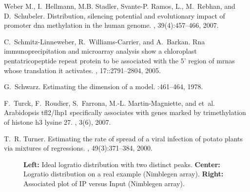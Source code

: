 \documentclass{bioinfo}
\begin{document}
\begin{thebibliography}{}
Weber M., I.~Hellmann, M.B. Stadler, Svante-P. Ramos, L., M.~Rebhan, and
  D.~Schubeler.
\newblock Distribution, silencing potential and evolutionary impact of promoter
  dna methylation in the human genome.
, 39(4):457--466, 2007.

C.~Schmitz-Linneweber, R.~Williams-Carrier, and A.~Barkan.
\newblock Rna immunoprecipitation and microarray analysis show a chloroplast
  pentatricopeptide repeat protein to be associated with the 5' region of mrnas
  whose translation it activates.
, 17::2791--2804, 2005.

G.~Schwarz.
\newblock Estimating the dimension of a model.
:461--464, 1978.

F.~Turck, F.~Roudier, S.~Farrona, M.-L. Martin-Magniette, and et~al.
\newblock Arabidopsis tfl2/lhp1 specifically associates with genes marked by
  trimethylation of histone h3 lysine 27.
, 3(6), 2007.

T.~R. Turner.
\newblock Estimating the rate of spread of a viral infection of potato plants
  via mixtures of regressions.
, 49(3):371--384, 2000.

\end{thebibliography}

\newpage

\begin{figure}
\begin{center}
\end{center}
\caption{\textbf{Left:} Ideal logratio distribution with two
distinct peaks. \textbf{Center:} Logratio distribution on a real
example (Nimblegen array). \textbf{Right:} Associated plot of IP
versus Input (Nimblegen array). \label{Figure:Histogramme}}
\end{figure}
\end{document}

